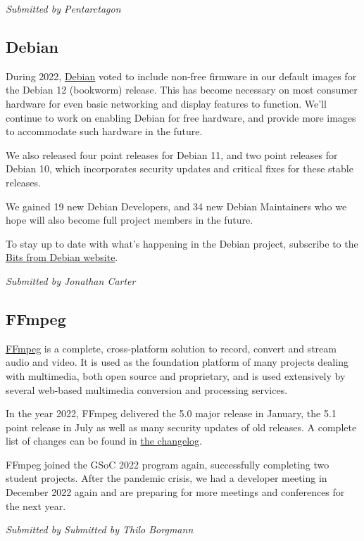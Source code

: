 \documentclass[a4paper]{report}
\begin{document}
{\em Submitted by Pentarctagon}

\subsection{Debian}

During 2022, \href{https://www.debian.org/}{Debian} voted to include non-free firmware in our default images for the Debian 12 (bookworm) release.  This has become necessary on most consumer hardware for even basic networking and display features to function. We'll continue to work on enabling Debian for free hardware, and provide more images to accommodate such hardware in the future.

We also released four point releases for Debian 11, and two point releases for Debian 10, which incorporates security updates and critical fixes for these stable releases.

We gained 19 new Debian Developers, and 34 new Debian Maintainers who we hope will also become full project members in the future.

To stay up to date with what's happening in the Debian project, subscribe to the \href{https://bits.debian.org/}{Bits from Debian website}.

{\em Submitted by Jonathan Carter}

\subsection{FFmpeg}

\href{https://www.ffmpeg.org/}{FFmpeg} is a complete, cross-platform solution to record, convert and stream audio and video. It is used as the foundation platform of many projects dealing with multimedia, both open source and proprietary, and is used extensively by several web-based multimedia conversion and processing services.

In the year 2022, FFmpeg delivered the 5.0 major release in January, the 5.1 point release in July as well as many security updates of old releases.  A complete list of changes can be found in \href{https://git.ffmpeg.org/gitweb/ffmpeg.git/blob/HEAD:/Changelog}{the changelog}.

FFmpeg joined the GSoC 2022 program again, successfully completing two student projects.  After the pandemic crisis, we had a developer meeting in December 2022 again and are preparing for more meetings and conferences for the next year.

{\em Submitted by Submitted by Thilo Borgmann}
\end{document}
